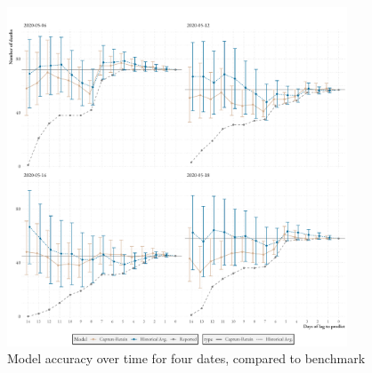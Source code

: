 \begin{figure}[h]
    \centering
    \includegraphics[width=0.9\textwidth]{../plots/lag_prediction_by_date}
    \caption{Model accuracy over time for four dates, compared to benchmark}
    \label{fig:four_dates}
\end{figure}
